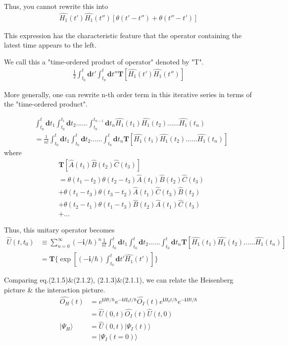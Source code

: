  Thus, you cannot rewrite this into
\begin{align}
\hat{H_1}(t')\hat{H_1}(t'')[\theta(t'-t'')+\theta(t''-t')] \nonumber
\end{align}

 This expression has the characteristic feature that the operator containing the latest  time appears to the left.

 We call this a "time-ordered product of operator" denoted by "T".
\begin{align}
\frac{1}{2}\int_{t_0}^{t}\bm{d}t'\int_{t_0}^{t}\bm{d}t''\bm{T}[\hat{H_1}(t')\hat{H_1}(t'')]\nonumber
\end{align}

 More generally, one can rewrite n-th order term in this iterative series in terms of the "time-ordered product".

\begin{align}\label{2-1-7}
&\int_{t_0}^{t}\bm{d}t_1\int_{t_0}^{t_1}\bm{d}t_2......\int_{t_0}^{t_{n-1}}\bm{d}t_n \hat{H_1}(t_1)\hat{H_1}(t_2)......\hat{H_1}(t_n)\nonumber \\
&= \frac{1}{n!}\int_{t_0}^{t}\bm{d}t_1\int_{t_0}^{t}\bm{d}t_2......\int_{t_0}^{t}\bm{d}t_n\bm{T}[\hat{H_1}(t_1)\hat{H_1}(t_2)......\hat{H_1}(t_n)]
\end{align}
where
\begin{align}
&\bm{T}[\hat{A}(t_1)\hat{B}(t_2)\hat{C}(t_3)] \nonumber \\
&=\theta(t_1-t_2)\theta(t_2-t_3)\hat{A}(t_1)\hat{B}(t_2)\hat{C}(t_3) \nonumber \\
&+\theta(t_1-t_3)\theta(t_3-t_2)\hat{A}(t_1)\hat{C}(t_3)\hat{B}(t_2) \nonumber \\
&+\theta(t_2-t_1)\theta(t_1-t_3)\hat{B}(t_2)\hat{A}(t_1)\hat{C}(t_3) \nonumber \\
&+ ... \nonumber
\end{align}

 Thus, this unitary operator becomes
\begin{align}
\hat{U}(t,t_0)&\equiv\sum_{n=0}^{\infty}(-\bm{i}/\hbar)^n\frac{1}{n!}\int_{t_0}^{t}\bm{d}t_1\int_{t_0}^{t}\bm{d}t_2......\int_{t_0}^{t}\bm{d}t_n\bm{T}[\hat{H_1}(t_1)\hat{H_1}(t_2)......\hat{H_1}(t_n)] \nonumber \\
&=\bm{T} \{\exp[(-\bm{i}/\hbar)\int_{t_0}^{t}\bm{d}t'\hat{H_1}(t')]\}
\end{align}

 	Comparing eq.(2.1.5)\&(2.1.2), (2.1.3)\&(2.1.1), we can relate the Heisenberg picture \& the interaction picture.
\begin{align}
\hat{O_H}(t)&=e^{\bm{i}Ht/\hbar}e^{-\bm{i}H_0t/\hbar}\hat{O_I}(t)e^{\bm{i}H_0t/\hbar}e^{-\bm{i}Ht/\hbar} \nonumber \\
&=\hat{U}(0,t)\hat{O_I}(t)\hat{U}(t,0) \nonumber \\
|\Psi_H\rangle&=\hat{U}(0,t)|\Psi_I(t)\rangle \nonumber \\
&=|\Psi_I(t=0)\rangle
\end{align}







